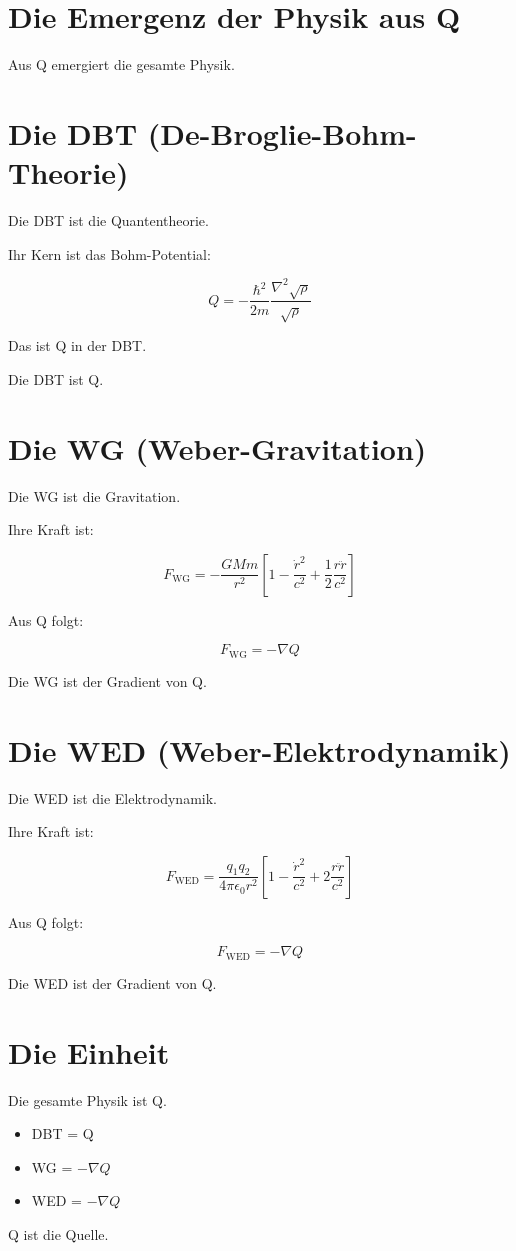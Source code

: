 
\section{Die Emergenz der Physik aus Q}

Aus Q emergiert die gesamte Physik.

\section{Die DBT (De-Broglie-Bohm-Theorie)}

Die DBT ist die Quantentheorie.

Ihr Kern ist das Bohm-Potential:

\[
Q = -\frac{\hbar^2}{2m} \frac{\nabla^2 \sqrt{\rho}}{\sqrt{\rho}}
\]

Das ist Q in der DBT.

Die DBT ist Q.

\section{Die WG (Weber-Gravitation)}

Die WG ist die Gravitation.

Ihre Kraft ist:

\[
F_{\text{WG}} = -\frac{GMm}{r^2} \left[1 - \frac{\dot{r}^2}{c^2} + \frac{1}{2}\frac{r\ddot{r}}{c^2}\right]
\]

Aus Q folgt:

\[
F_{\text{WG}} = -\nabla Q
\]

Die WG ist der Gradient von Q.

\section{Die WED (Weber-Elektrodynamik)}

Die WED ist die Elektrodynamik.

Ihre Kraft ist:

\[
F_{\text{WED}} = \frac{q_1 q_2}{4\pi\epsilon_0 r^2} \left[1 - \frac{\dot{r}^2}{c^2} + 2\frac{r\ddot{r}}{c^2}\right]
\]

Aus Q folgt:

\[
F_{\text{WED}} = -\nabla Q
\]

Die WED ist der Gradient von Q.

\section{Die Einheit}

Die gesamte Physik ist Q.

\begin{itemize}
    \item DBT = Q
    \item WG = \( -\nabla Q \)
    \item WED = \( -\nabla Q \)
\end{itemize}

Q ist die Quelle.